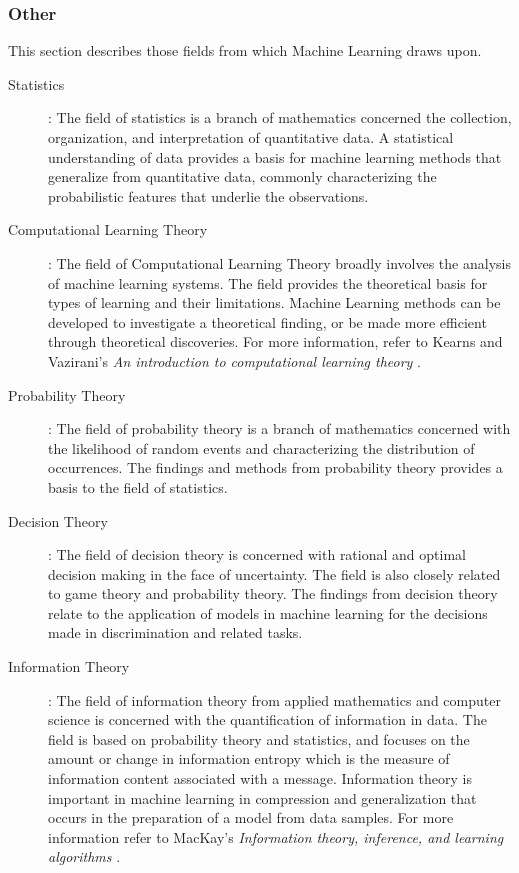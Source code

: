 \documentclass[a4paper, 11pt]{article}
\begin{document}
\subsubsection{Other}
This section describes those fields from which Machine Learning draws upon. 

\begin{description}
	\item[Statistics]: The field of statistics is a branch of mathematics concerned the collection, organization, and interpretation of quantitative data. A statistical understanding of data provides a basis for machine learning methods that generalize from quantitative data, commonly characterizing the probabilistic features that underlie the observations.
	
	\item[Computational Learning Theory]: The field of Computational Learning Theory broadly involves the analysis of machine learning systems. The field provides the theoretical basis for types of learning and their limitations. Machine Learning methods can be developed to investigate a theoretical finding, or be made more efficient through theoretical discoveries. For more information, refer to Kearns and Vazirani's \emph{An introduction to computational learning theory} \cite{Kearns1994}.
	
	\item[Probability Theory]: The field of probability theory is a branch of mathematics concerned with the likelihood of random events and characterizing the distribution of occurrences. The findings and methods from probability theory provides a basis to the field of statistics. 
	
	\item[Decision Theory]: The field of decision theory is concerned with rational and optimal decision making in the face of uncertainty. The field is also closely related to game theory and probability theory. The findings from decision theory relate to the application of models in machine learning for the decisions made in discrimination and related tasks.
	
	\item[Information Theory]:	The field of information theory from applied mathematics and computer science is concerned with the quantification of information in data. The field is based on probability theory and statistics, and focuses on the amount or change in information entropy which is the measure of information content associated with a message. Information theory is important in machine learning in compression and generalization that occurs in the preparation of a model from data samples. For more information refer to MacKay's \emph{Information theory, inference, and learning algorithms} \cite{MacKay2003}.
\end{description}
\end{document}
